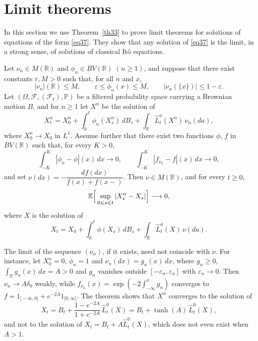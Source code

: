 \section{Limit theorems}

In this section we use Theorem~\ref{th33} to prove limit theorems for solutions
of equations of the form \eqref{eq37}. They show that any solution of
\eqref{eq37} is the limit, in a strong sense, of solutions of classical It\^o
equations.

\begin{theorem}\label{th331}
	Let $\nu_n\in M(\mathbb{R})$ and $\phi_n\in BV(\mathbb{R})$ $(n\geqslant 1)$, and
	suppose that there exist constants $\varepsilon , M>0$ such that, for all $n$
	and $x$,
	\[
		|\nu_n| (\mathbb{R})\leqslant M, \qquad
		\varepsilon\leqslant \phi_n(x)\leqslant M, \qquad
		|\nu_n(\{ x\})| \leqslant 1-\varepsilon .
	\]
	Let $(\Omega,\mathcal{F},(\mathcal{F}_t), \mathbb{P})$ be a filtered probability
	space carrying a Brownian motion $B$, and for $n\geqslant 1$ let $X^n$ be the
	solution of
	\[
		X_t^n=X^n_0+\int_0^t \phi_n(X_s^n)\,dB_s+\int_\mathbb{R} \hat{L}_t^a(X^n)\,\nu_n(da),
	\]
	where $X_0^n \to X_0$ in $L^1$. Assume further that there exist two functions
	$\phi$, $f$ in $BV(\mathbb{R})$ such that, for every $K>0$,
	\[
		\int_{-K}^{K}|\phi_n - \phi |(x)\,dx \longrightarrow 0 , \qquad
		\int_{-K}^{K}|f_{\nu_n} - f |(x)\,dx \longrightarrow 0,
	\]
	and set $\nu(dx)=-\dfrac{df(dx)}{f(x)+f(x-)}$. Then $\nu\in M(\mathbb{R})$, and for
	every $t\geqslant 0$,
	\[
		\mathbb{E}\Big[\sup_{0\leqslant s\leqslant t}|X_s^n-X_s|\Big] \longrightarrow 0,
	\]
	where $X$ is the solution of
	\[
		X_t=X_0 + \int_0^t \phi(X_s)\,dB_s+\int_\mathbb{R} \hat{L}_t^a(X)\,\nu(da) .
	\]
\end{theorem}

\begin{remark}\label{rem:limitnu}
	The limit of the sequence $(\nu_n)$, if it exists, need not coincide with $\nu$.
	For instance, let $X_0^n = 0$, $\phi_n =1$ and $\nu_n(dx)=g_n (x)\,dx$, where
	$g_n \geqslant 0$, $\int_\mathbb{R} g_n (x)\,dx = A > 0$ and $g_n$ vanishes outside
	$[-\varepsilon_n , \varepsilon_n ]$ with $\varepsilon_n\to 0$. Then
	$\nu_n \to A\delta_0$ weakly, while $f_{\nu_n}(x) = \exp(-2\int_{-\infty}^x g_n)$
	converges to $f = 1_{]-\infty,0[} + e^{-2A}1_{[0,\infty[}$. The theorem shows that
	$X^n$ converges to the solution of
	\[
		X_t=B_t + \frac{1-e^{-2A}}{1+e^{-2A}}\,\hat{L}_t^0 (X) = B_t + \tanh(A)\,\hat{L}_t^0 (X) ,
	\]
	and not to the solution of $X_t = B_t + A\hat{L}^0_t(X)$, which does not even exist
	when $A > 1$.
\end{remark}

